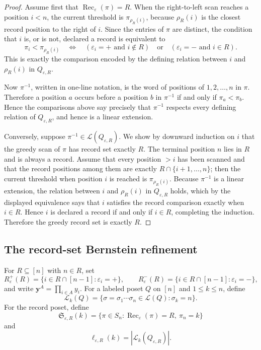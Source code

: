 \documentclass[10pt,a4paper]{amsart}
\newcommand{\eps}{\varepsilon}
\begin{document}
\begin{proof}
Assume first that \(\operatorname{Rec}_\eps(\pi)=R\).  When the
right-to-left scan reaches a position \(i<n\), the current threshold is
\(\pi_{\rho_R(i)}\), because \(\rho_R(i)\) is the closest record position to
the right of \(i\).  Since the entries of \(\pi\) are distinct, the condition
that \(i\) is, or is not, declared a record is equivalent to
\[
\pi_i<\pi_{\rho_R(i)}
\quad\Longleftrightarrow\quad
(\eps_i=+\text{ and }i\notin R)
\quad\text{or}\quad
(\eps_i=-\text{ and }i\in R).
\]
This is exactly the comparison encoded by the defining relation between
\(i\) and \(\rho_R(i)\) in \(Q_{\eps,R}\).

Now \(\pi^{-1}\), written in one-line notation, is the word of positions of
\(1,2,\ldots,n\) in \(\pi\).  Therefore a position \(a\) occurs before a
position \(b\) in \(\pi^{-1}\) if and only if \(\pi_a<\pi_b\).  Hence the
comparisons above say precisely that \(\pi^{-1}\) respects every defining
relation of \(Q_{\eps,R}\), and hence is a linear extension.

Conversely, suppose \(\pi^{-1}\in\mathcal L(Q_{\eps,R})\).  We show by
downward induction on \(i\) that the greedy scan of \(\pi\) has record set
exactly \(R\).  The terminal position \(n\) lies in \(R\) and is always a
record.  Assume that every position \(>i\) has been scanned and that the
record positions among them are exactly \(R\cap\{i+1,\ldots,n\}\); then the
current threshold when position \(i\) is reached is \(\pi_{\rho_R(i)}\).
Because \(\pi^{-1}\) is a linear extension, the relation between \(i\) and
\(\rho_R(i)\) in \(Q_{\eps,R}\) holds, which by the displayed equivalence
says that \(i\) satisfies the record comparison exactly when \(i\in R\).
Hence \(i\) is declared a record if and only if \(i\in R\), completing the
induction.  Therefore the greedy record set is exactly \(R\).
\end{proof}

\subsection{The record-set Bernstein refinement}

For \(R\subseteq[n]\) with \(n\in R\), set
\[
R_\eps^+(R)=\{i\in R\cap[n-1]:\eps_i=+\},\qquad
R_\eps^-(R)=\{i\in R\cap[n-1]:\eps_i=-\},
\]
and write \(\mathbf y^A=\prod_{i\in A}y_i\).  For a labeled poset \(Q\) on
\([n]\) and \(1\le k\le n\), define
\[
\mathcal L_k(Q)
 =\{\sigma=\sigma_1\cdots\sigma_n\in\mathcal L(Q):\sigma_k=n\}.
\]
For the record poset, define
\[
\mathfrak S_{\eps,R}(k)
 =\{\pi\in S_n:\operatorname{Rec}_\eps(\pi)=R,\ \pi_n=k\}
\]
and
\[
\ell_{\eps,R}(k)=|\mathcal L_k(Q_{\eps,R})|.
\]
\end{document}
